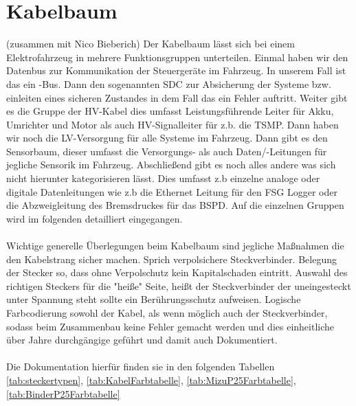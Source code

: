 \section{Kabelbaum} (zusammen mit Nico Bieberich)
Der Kabelbaum lässt sich bei einem Elektrofahrzeug in mehrere Funktionsgruppen unterteilen. Einmal haben wir den Datenbus zur Kommunikation der Steuergeräte im Fahrzeug. In unserem Fall ist das ein -Bus. Dann den sogenannten \ac{SDC} zur Absicherung der Systeme bzw. einleiten eines sicheren Zustandes in dem Fall das ein Fehler auftritt. Weiter gibt es die Gruppe der \ac{HV}-Kabel dies umfasst Leistungsführende Leiter für Akku, Umrichter und Motor als auch \ac{HV}-Signalleiter für z.b. die \ac{TSMP}. Dann haben wir noch die \ac{LV}-Versorgung für alle Systeme im Fahrzeug. Dann gibt es den Sensorbaum, dieser umfasst die Versorgungs- als auch Daten/-Leitungen für jegliche Sensorik im Fahrzeug. Abschließend gibt es noch alles andere was sich nicht hierunter kategorisieren lässt. Dies umfasst z.b einzelne analoge oder digitale Datenleitungen wie z.b die Ethernet Leitung für den \ac{FSG} Logger oder die Abzweigleitung des Bremsdruckes für das \ac{BSPD}. Auf die einzelnen Gruppen wird im folgenden detailliert eingegangen.\\
\\
Wichtige generelle Überlegungen beim Kabelbaum sind jegliche Maßnahmen die den Kabelstrang  sicher machen. Sprich verpolsichere Steckverbinder. Belegung der Stecker so, dass ohne Verpolschutz kein Kapitalschaden eintritt. Auswahl des richtigen Steckers für die "heiße" Seite, heißt der Steckverbinder der uneingesteckt unter Spannung steht sollte ein Berührungsschutz aufweisen. Logische Farbcodierung sowohl der Kabel, als wenn möglich auch der Steckverbinder, sodass beim Zusammenbau keine Fehler gemacht werden und dies einheitliche über Jahre durchgängige geführt und damit auch Dokumentiert.\\
\\
Die Dokumentation hierfür finden sie in den folgenden Tabellen \ref{tab:steckertypen}, \ref{tab:KabelFarbtabelle}, \ref{tab:MizuP25Farbtabelle}, \ref{tab:BinderP25Farbtabelle}

